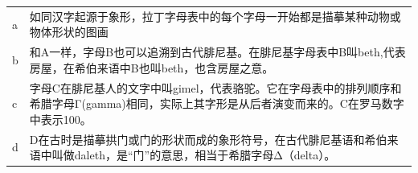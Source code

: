\documentclass[bachelor]{seuthesis} %
\begin{document}
\tableofcontents

\begin{terminology}
\begin{table}[h]
\renewcommand\arraystretch{1.5}
\begin{tabular}{>{\LARGE}m{} <{\centering}m{}}
a & 如同汉字起源于象形，拉丁字母表中的每个字母一开始都是描摹某种动物或物体形状的图画\\

b&和A一样，字母B也可以追溯到古代腓尼基。在腓尼基字母表中B叫beth,代表房屋，在希伯来语中B也叫beth，也含房屋之意。\\

c& 字母C在腓尼基人的文字中叫gimel，代表骆驼。它在字母表中的排列顺序和希腊字母Γ(gamma)相同，实际上其字形是从后者演变而来的。C在罗马数字中表示100。\\

d&D在古时是描摹拱门或门的形状而成的象形符号，在古代腓尼基语和希伯来语中叫做daleth，是“门”的意思，相当于希腊字母Δ（delta）。\\

\end{tabular}
\end{table}

\end{terminology}
\end{document}
